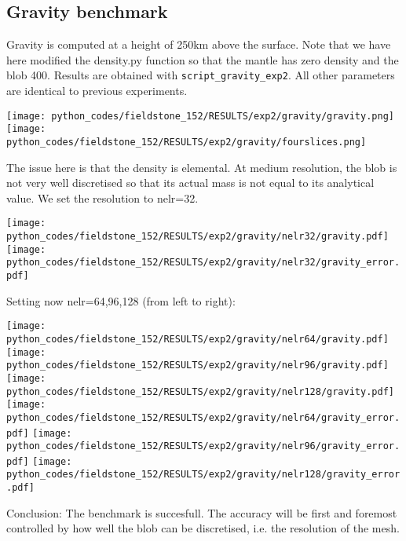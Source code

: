 \newpage
\subsection*{Gravity benchmark}

Gravity is computed at a height of 250km above the surface. 
Note that we have here modified the {\python density.py} function so 
that the mantle has zero density and the blob 400. 
Results are obtained with {\tt script\_gravity\_exp2}.
All other parameters are identical to previous experiments.

\begin{center}
\texttt{[image: python\_codes/fieldstone\_152/RESULTS/exp2/gravity/gravity.png]}
\texttt{[image: python\_codes/fieldstone\_152/RESULTS/exp2/gravity/fourslices.png]}
\end{center}

The issue here is that the density is elemental. At medium resolution, the blob is not 
very well discretised so that its actual mass is not equal to its analytical value. 
We set the resolution to {\python nelr=32}.

\begin{center}
\texttt{[image: python\_codes/fieldstone\_152/RESULTS/exp2/gravity/nelr32/gravity.pdf]}
\texttt{[image: python\_codes/fieldstone\_152/RESULTS/exp2/gravity/nelr32/gravity\_error.pdf]}
\end{center}

Setting now {\python nelr=64,96,128} (from left to right):

\begin{center}
\texttt{[image: python\_codes/fieldstone\_152/RESULTS/exp2/gravity/nelr64/gravity.pdf]}
\texttt{[image: python\_codes/fieldstone\_152/RESULTS/exp2/gravity/nelr96/gravity.pdf]}
\texttt{[image: python\_codes/fieldstone\_152/RESULTS/exp2/gravity/nelr128/gravity.pdf]}\\
\texttt{[image: python\_codes/fieldstone\_152/RESULTS/exp2/gravity/nelr64/gravity\_error.pdf]}
\texttt{[image: python\_codes/fieldstone\_152/RESULTS/exp2/gravity/nelr96/gravity\_error.pdf]}
\texttt{[image: python\_codes/fieldstone\_152/RESULTS/exp2/gravity/nelr128/gravity\_error.pdf]}\\
\end{center}

Conclusion: The benchmark is succesfull. 
The accuracy will be first and foremost controlled by how well the blob can be discretised, 
i.e. the resolution of the mesh. 





